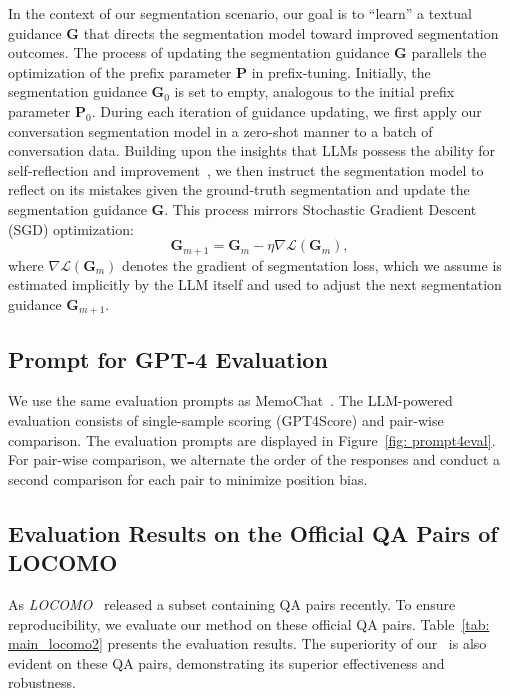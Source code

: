 In the context of our segmentation scenario, our goal is to ``learn'' a textual guidance $\boldsymbol{G}$ that directs the segmentation model toward improved segmentation outcomes. The process of updating the segmentation guidance $\boldsymbol{G}$ parallels the optimization of the prefix parameter $\bm{P}$ in prefix-tuning. Initially, the segmentation guidance $\boldsymbol{G}_{0}$ is set to empty, analogous to the initial prefix parameter $\bm{P}_{0}$. During each iteration of guidance updating, we first apply our conversation segmentation model in a zero-shot manner to a batch of conversation data. Building upon the insights that LLMs possess the ability for self-reflection and improvement~\citep{shinn2023reflexion, renze2024self}, we then instruct the segmentation model to reflect on its mistakes given the ground-truth segmentation and update the segmentation guidance $\boldsymbol{G}$. This process mirrors Stochastic Gradient Descent (SGD) optimization:
\begin{equation}
    \boldsymbol{G}_{m+1}=\boldsymbol{G}_m-\eta \nabla \mathcal{L}\left(\boldsymbol{G}_m\right), 
\end{equation}
where $\nabla \mathcal{L}\left(\boldsymbol{G}_m\right)$ denotes the gradient of segmentation loss, which we assume is estimated implicitly by the LLM itself and used to adjust the next segmentation guidance $\boldsymbol{G}_{m+1}$.


\subsection{Prompt for GPT-4 Evaluation}
\label{sec: prompt4eval}

We use the same evaluation prompts as  MemoChat~\citep{lu2023memochat}. The LLM-powered evaluation consists of single-sample scoring (GPT4Score) and pair-wise comparison. The evaluation prompts are displayed in Figure~\ref{fig: prompt4eval}. For pair-wise comparison, we alternate the order of the responses and conduct a second comparison for each pair to minimize position bias. 



\subsection{Evaluation Results on the Official QA Pairs of LOCOMO}
\label{sec: main_locomo2}
As \textit{LOCOMO}~\citep{maharana2024evaluating} released a subset containing QA pairs recently. To ensure reproducibility, we evaluate our method on these official QA pairs. Table~\ref{tab: main_locomo2} presents the evaluation results. The superiority of our \sysname\ is also evident on these QA pairs, demonstrating its superior effectiveness and robustness.

